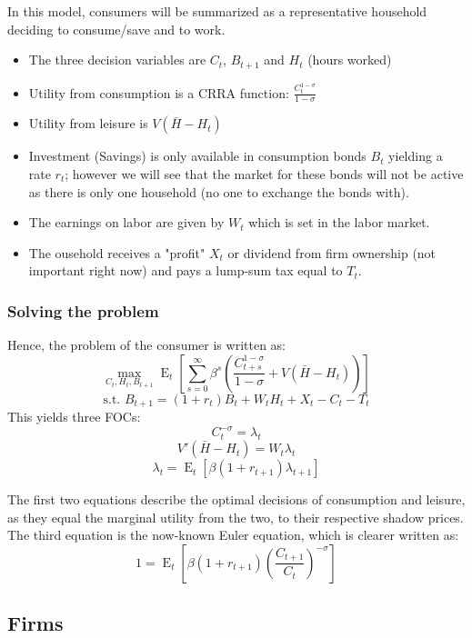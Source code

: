 \documentclass[12pt]{report}
\newcommand{\Et}[1]{\operatorname{E}_t\left[#1\right]}
\begin{document}
In this model, consumers will be summarized as a representative household deciding to consume/save and to work.
\begin{itemize}
\item The three decision variables are $C_t$, $B_{t+1}$ and $H_t$ (hours worked)
\item Utility from consumption is a CRRA function: $\frac{C_t^{1-\sigma}}{1-\sigma}$
\item Utility from leisure is $V(\bar H - H_t)$
\item Investment (Savings) is only available in consumption bonds $B_t$ yielding a rate $r_t$; however we will see that the market for these bonds will not be active as there is only one household (no one to exchange the bonds with). 
\item The earnings on labor are given by $W_t$ which is set in the labor market.
\item The ousehold receives a "profit" $X_t$ or dividend from firm ownership (not important right now) and pays a lump-sum tax equal to $T_t$.
\end{itemize}

\subsubsection{Solving the problem}

Hence, the problem of the consumer is written as:$$\max_{C_t, H_t, B_{t+1}} \Et{\sum_{s=0}^{\infty}\beta^s\left(\frac{C_{t+s}^{1-\sigma}}{1-\sigma} + V(\bar H - H_t)\right)} $$ $$\text{s.t. } B_{t+1} = (1+r_t)B_t + W_tH_t + X_t - C_t - T_t $$
This yields three FOCs:\begin{equation}
C_t^{-\sigma} = \lambda_t  
\end{equation}
\begin{equation}
V'(\bar H - H_t) = W_t \lambda_t
\end{equation}
\begin{equation}
\lambda_t = \Et{\beta(1+r_{t+1})\lambda_{t+1}} 
\end{equation}

The first two equations describe the optimal decisions of consumption and leisure, as they equal the marginal utility from the two, to their respective shadow prices. The third equation is the now-known Euler equation, which is clearer written as: $$1 = \Et{\beta(1+r_{t+1})\left(\frac{C_{t+1}}{C_t}\right)^{-\sigma}} $$

\subsection{Firms}
\end{document}
